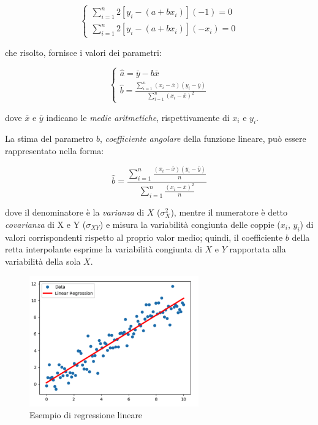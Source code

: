 $$\left\{\begin{array}{l}
\sum_{i=1}^{n} 2\left[y_{i}-\left(a+b x_{i}\right)\right](-1)=0 \\
\sum_{i=1}^{n} 2\left[y_{i}-\left(a+b x_{i}\right)\right]\left(-x_{i}\right)=0
\end{array}\right.$$\smallskip

che risolto, fornisce i valori dei parametri:

$$\left\{\begin{array}{l}
\hat{a}=\bar{y}-b \bar{x} \\
\hat{b}=\frac{\sum_{i=1}^{n}\left(x_{i}-\bar{x}\right)\left(y_{i}-\bar{y}\right)}{\sum_{i=1}^{n}\left(x_{i}-\bar{x}\right)^{2}}
\end{array}\right.$$\smallskip

dove $\bar{x}$ e $\bar{y}$ indicano le \textit{medie aritmetiche}, rispettivamente di $x_i$ e $y_i$.

La stima del parametro $b$, \textit{coefficiente angolare} della funzione lineare, può essere rappresentato nella forma:

$$\hat{b}=\frac{\sum_{i=1}^{n} \frac{\left(x_{i}-\bar{x}\right)\left(y_{i}-\bar{y}\right)}{n}}{\sum_{i=1}^{n} \frac{\left(x_{i}-\bar{x}\right)^{2}}{n}}$$\smallskip

dove il denominatore è la \textit{varianza} di $X$ ($\sigma_{X}^{2}$), mentre il numeratore è detto \textit{covarianza} di X e Y ($\sigma_{XY}$) e misura la variabilità congiunta delle coppie ($x_i$, $y_i$) di valori corrispondenti rispetto al proprio valor medio; quindi, il coefficiente $b$ della retta interpolante esprime la variabilità congiunta di $X$ e $Y$ rapportata alla variabilità della sola $X$.

\begin{figure}[H]
\centering
\includegraphics[width=0.65\textwidth,height=\textheight,keepaspectratio]{img/lin_reg_example.png}
\caption{Esempio di regressione lineare}
\label{fig:reg_lin}
\end{figure}

